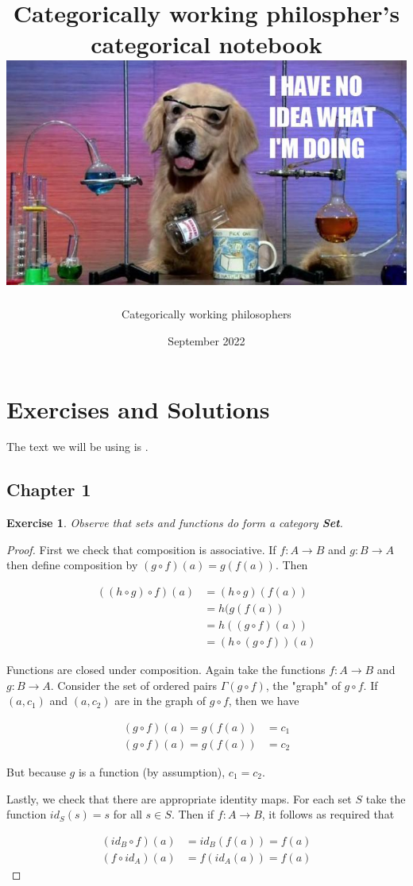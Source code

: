 \documentclass[12pt]{article}
\title{{Categorically working philospher's categorical notebook}\\
{\includegraphics[width=\textwidth]{dog.jpg}}}
\author{Categorically working philosophers}
\date{September 2022}
\newcommand{\catname}[1]{{\normalfont\textbf{#1}}}
\newtheorem*{exercise}{Exercise}
\begin{document}
\maketitle

\section{Exercises and Solutions}

The text we will be using is \autocite{simmons2011introduction}.

\subsection{Chapter 1}

\begin{exercise}Observe that sets and functions do form a category \catname{Set}.\end{exercise}

\begin{proof}
First we check that composition is associative. If $f: A \rightarrow B$ and $g: B \rightarrow A$ then define composition by $(g \circ f)(a) = g(f(a))$. Then 

\begin{align*}
((h \circ g ) \circ f)(a) 
&= (h \circ g)(f(a)) \\
&= h(g(f(a)) \\
&= h((g \circ f)(a)) \\
&= (h \circ (g \circ f))(a)
\end{align*}

Functions are closed under composition. Again take the functions $f: A \rightarrow B$ and $g: B \rightarrow A$. Consider the set of ordered pairs $\Gamma(g \circ f)$, the "graph" of $g \circ f$. If $(a, c_1)$ and $(a, c_2)$ are in the graph of $g \circ f$, then we have 

\begin{align*}
(g \circ f)(a) = g(f(a)) &= c_1 \\
(g \circ f)(a) = g(f(a)) &= c_2
\end{align*}

But because $g$ is a function (by assumption), $c_1 = c_2$.

Lastly, we check that there are appropriate identity maps. For each set $S$ take the function $id_S(s) = s$ for all $s \in S$. Then if $f: A \rightarrow B$, it follows as required that

\begin{align*}
(id_B \circ f)(a) &= id_B(f(a)) = f(a) \\
(f \circ id_A)(a) &= f(id_A(a)) = f(a) 
\end{align*}

\end{proof}
\end{document}

